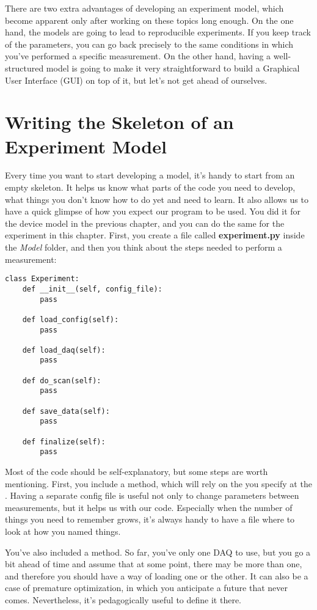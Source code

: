There are two extra advantages of developing an experiment model, which become apparent only after working on these topics long enough. On the one hand, the models are going to lead to reproducible experiments. If you keep track of the parameters, you can go back precisely to the same conditions in which you've performed a specific measurement. On the other hand, having a well-structured model is going to make it very straightforward to build a Graphical User Interface ({GUI}) on top of it, but let's not get ahead of ourselves.

\section{Writing the Skeleton of an Experiment Model}\label{sec:skeleton-experiment-model}
Every time you want to start developing a model, it's handy to start from an empty skeleton. It helps us know what parts of the code you need to develop, what things you don't know how to do yet and need to learn. It also allows us to have a quick glimpse of how you expect our program to be used. You did it for the device model in the previous chapter, and you can do the same for the experiment in this chapter. First, you create a file called \textbf{experiment.py} inside the \emph{Model} folder, and then you think about the steps needed to perform a measurement:

\begin{verbatim}
class Experiment:
    def __init__(self, config_file):
        pass

    def load_config(self):
        pass

    def load_daq(self):
        pass

    def do_scan(self):
        pass

    def save_data(self):
        pass

    def finalize(self):
        pass

\end{verbatim}

Most of the code should be self-explanatory, but some steps are worth mentioning. First, you include a  method, which will rely on the  you specify at the . Having a separate config file is useful not only to change parameters between measurements, but it helps us with our code. Especially when the number of things you need to remember grows, it's always handy to have a file where to look at how you named things.

You've also included a  method. So far, you've only one DAQ to use, but you go a bit ahead of time and assume that at some point, there may be more than one, and therefore you should have a way of loading one or the other. It can also be a case of premature optimization, in which you anticipate a future that never comes. Nevertheless, it's pedagogically useful to define it there.

